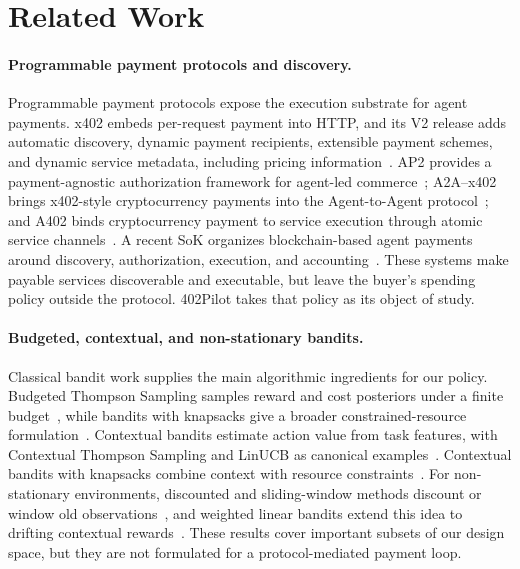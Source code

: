 \section{Related Work}
\label{sec:related-work}

\paragraph{Programmable payment protocols and discovery.}
Programmable payment protocols expose the execution substrate for agent payments. x402 embeds per-request payment into HTTP, and its V2 release adds automatic discovery, dynamic payment recipients, extensible payment schemes, and dynamic service metadata, including pricing information~\citep{coinbase2025x402v2}. AP2 provides a payment-agnostic authorization framework for agent-led commerce~\citep{google2025ap2}; A2A--x402 brings x402-style cryptocurrency payments into the Agent-to-Agent protocol~\citep{a2ax402}; and A402 binds cryptocurrency payment to service execution through atomic service channels~\citep{a402}. A recent SoK organizes blockchain-based agent payments around discovery, authorization, execution, and accounting~\citep{sok2026agentpayments}. These systems make payable services discoverable and executable, but leave the buyer's spending policy outside the protocol. 402Pilot takes that policy as its object of study.

\paragraph{Budgeted, contextual, and non-stationary bandits.}
Classical bandit work supplies the main algorithmic ingredients for our policy. Budgeted Thompson Sampling samples reward and cost posteriors under a finite budget~\citep{xia2015bts}, while bandits with knapsacks give a broader constrained-resource formulation~\citep{badanidiyuru2018bandits}. Contextual bandits estimate action value from task features, with Contextual Thompson Sampling and LinUCB as canonical examples~\citep{agrawal2013contextualts,li2010linucb}. Contextual bandits with knapsacks combine context with resource constraints~\citep{agrawal2016linearcbwk}. For non-stationary environments, discounted and sliding-window methods discount or window old observations~\citep{garivier2011discounted,trovo2020sliding,qi2023dsts}, and weighted linear bandits extend this idea to drifting contextual rewards~\citep{russac2019weighted}. These results cover important subsets of our design space, but they are not formulated for a protocol-mediated payment loop.

